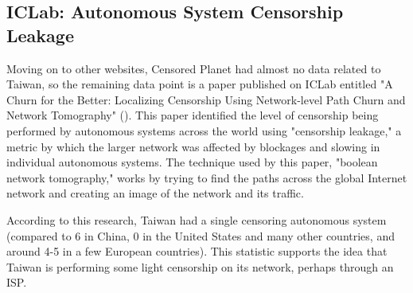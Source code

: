 \subsection{ICLab: Autonomous System Censorship Leakage}
Moving on to other websites, Censored Planet had almost no data related to Taiwan, so the remaining data point is a paper published on ICLab entitled
"A Churn for the Better: Localizing Censorship Using Network-level Path Churn and Network Tomography" (\cite{Cho_CoNEXT17}). This paper identified the level
of censorship being performed by autonomous systems across the world using "censorship leakage," a metric by which the larger network was affected by blockages
and slowing in individual autonomous systems. The technique used by this paper, "boolean network tomography," works by trying to find the paths across the
global Internet network and creating an image of the network and its traffic.

According to this research, Taiwan had a single censoring autonomous system (compared to 6 in China, 0 in the
United States and many other countries, and around 4-5 in a few European countries). This statistic supports the idea that Taiwan is performing some light
censorship on its network, perhaps through an ISP.

